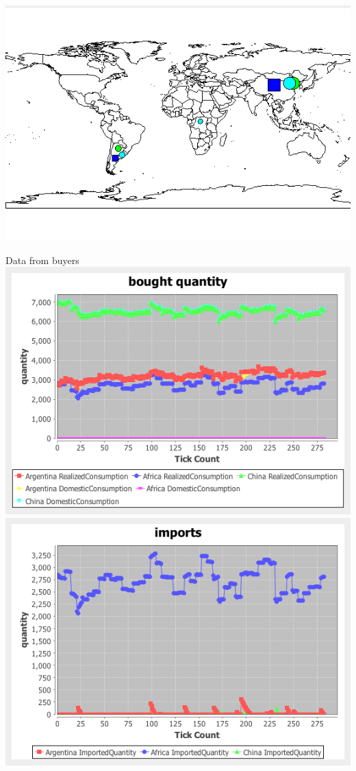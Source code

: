 \documentclass{article}
\begin{document}
\vskip2mm
\noindent
\includegraphics[scale=0.6]{fig_case7_map}

\noindent Data from buyers
\vskip2mm
\hskip-2cm
\includegraphics[scale=0.4]{fig_case7_qs}
\includegraphics[scale=0.4]{fig_case7_imports}
\end{document}
